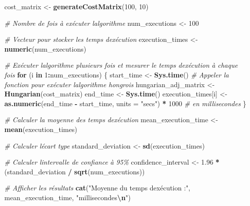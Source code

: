 \documentclass[
]{article}
\newenvironment{Shaded}{\begin{snugshade}}{\end{snugshade}}
\newcommand{\AttributeTok}[1]{\textcolor[rgb]{0.13,0.29,0.53}{#1}}
\newcommand{\CommentTok}[1]{\textcolor[rgb]{0.56,0.35,0.01}{\textit{#1}}}
\newcommand{\ControlFlowTok}[1]{\textcolor[rgb]{0.13,0.29,0.53}{\textbf{#1}}}
\newcommand{\DecValTok}[1]{\textcolor[rgb]{0.00,0.00,0.81}{#1}}
\newcommand{\FloatTok}[1]{\textcolor[rgb]{0.00,0.00,0.81}{#1}}
\newcommand{\FunctionTok}[1]{\textcolor[rgb]{0.13,0.29,0.53}{\textbf{#1}}}
\newcommand{\NormalTok}[1]{#1}
\newcommand{\OtherTok}[1]{\textcolor[rgb]{0.56,0.35,0.01}{#1}}
\newcommand{\SpecialCharTok}[1]{\textcolor[rgb]{0.81,0.36,0.00}{\textbf{#1}}}
\newcommand{\StringTok}[1]{\textcolor[rgb]{0.31,0.60,0.02}{#1}}
\begin{document}
\begin{Shaded}
\begin{Highlighting}[]
\NormalTok{cost\_matrix }\OtherTok{\textless{}{-}} \FunctionTok{generateCostMatrix}\NormalTok{(}\DecValTok{100}\NormalTok{, }\DecValTok{10}\NormalTok{)}

\CommentTok{\# Nombre de fois à exécuter l\textquotesingle{}algorithme}
\NormalTok{num\_executions }\OtherTok{\textless{}{-}} \DecValTok{100}

\CommentTok{\# Vecteur pour stocker les temps d\textquotesingle{}exécution}
\NormalTok{execution\_times }\OtherTok{\textless{}{-}} \FunctionTok{numeric}\NormalTok{(num\_executions)}

\CommentTok{\# Exécuter l\textquotesingle{}algorithme plusieurs fois et mesurer le temps d\textquotesingle{}exécution à chaque fois}
\ControlFlowTok{for}\NormalTok{ (i }\ControlFlowTok{in} \DecValTok{1}\SpecialCharTok{:}\NormalTok{num\_executions) \{}
\NormalTok{  start\_time }\OtherTok{\textless{}{-}} \FunctionTok{Sys.time}\NormalTok{()}
  \CommentTok{\# Appeler la fonction pour exécuter l\textquotesingle{}algorithme hongrois}
\NormalTok{  hungarian\_adj\_matrix }\OtherTok{\textless{}{-}} \FunctionTok{Hungarian}\NormalTok{(cost\_matrix)}
\NormalTok{  end\_time }\OtherTok{\textless{}{-}} \FunctionTok{Sys.time}\NormalTok{()}
\NormalTok{  execution\_times[i] }\OtherTok{\textless{}{-}} \FunctionTok{as.numeric}\NormalTok{(end\_time }\SpecialCharTok{{-}}\NormalTok{ start\_time, }\AttributeTok{units =} \StringTok{"secs"}\NormalTok{) }\SpecialCharTok{*} \DecValTok{1000}  \CommentTok{\# en millisecondes}
\NormalTok{\}}

\CommentTok{\# Calculer la moyenne des temps d\textquotesingle{}exécution}
\NormalTok{mean\_execution\_time }\OtherTok{\textless{}{-}} \FunctionTok{mean}\NormalTok{(execution\_times)}

\CommentTok{\# Calculer l\textquotesingle{}écart type}
\NormalTok{standard\_deviation }\OtherTok{\textless{}{-}} \FunctionTok{sd}\NormalTok{(execution\_times)}

\CommentTok{\# Calculer l\textquotesingle{}intervalle de confiance à 95\%}
\NormalTok{confidence\_interval }\OtherTok{\textless{}{-}} \FloatTok{1.96} \SpecialCharTok{*}\NormalTok{ (standard\_deviation }\SpecialCharTok{/} \FunctionTok{sqrt}\NormalTok{(num\_executions))}

\CommentTok{\# Afficher les résultats}
\FunctionTok{cat}\NormalTok{(}\StringTok{"Moyenne du temps d\textquotesingle{}exécution :"}\NormalTok{, mean\_execution\_time, }\StringTok{"millisecondes}\SpecialCharTok{\textbackslash{}n}\StringTok{"}\NormalTok{)}
\end{Highlighting}
\end{Shaded}
\end{document}

